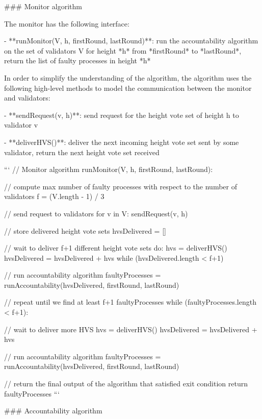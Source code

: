 \documentclass[a4paper,11pt,oneside]{report}
\begin{document}
\begin{markdown}
### Monitor algorithm

The monitor has the following interface:

- **runMonitor(V, h, firstRound, lastRound)**: run the accountability algorithm on the set of validators V for height *h* from *firstRound* to *lastRound*, return the list of faulty processes in height *h*

In order to simplify the understanding of the algorithm, the algorithm uses the following high-level methods to model the communication between the monitor and validators:

- **sendRequest(v, h)**: send request for the height vote set of height h to validator v 

- **deliverHVS()**: deliver the next incoming height vote set sent by some validator, return the next height vote set received

    ```
    // Monitor algorithm
    runMonitor(V, h, firstRound, lastRound):
        
        // compute max number of faulty processes with respect to the number of validators  
        f = (V.length - 1) / 3
        
        // send request to validators
        for v in V:
            sendRequest(v, h)
        
        // store delivered height vote sets
        hvsDelivered = []
        
        // wait to deliver f+1 different height vote sets
        do:
            hvs = deliverHVS()
            hvsDelivered = hvsDelivered + hvs
        while (hvsDelivered.length < f+1)
        
        // run accountability algorithm
        faultyProcesses = runAccountability(hvsDelivered, firstRound, lastRound)
        
        // repeat until we find at least f+1 faultyProcesses
        while (faultyProcesses.length < f+1):
        
            // wait to deliver more HVS
            hvs = deliverHVS()
            hvsDelivered = hvsDelivered + hvs
        
            // run accountability algorithm 
            faultyProcesses = runAccountability(hvsDelivered, firstRound, lastRound)    
           
            
        // return the final output of the algorithm that satisfied exit condition
        return faultyProcesses
    ```

### Accountability algorithm


\end{markdown}
\end{document}
